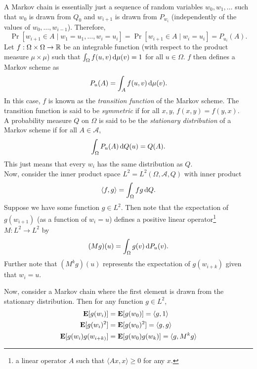 A Markov chain is essentially just a sequence of random variables $w_0,w_1,\ldots$ such that $w_0$ is drawn from $Q_0$ and $w_{i+1}$ is drawn from $P_{w_i}$ (independently of the values of $w_0,\ldots,w_{i-1}$). Therefore,
\[ \Pr[w_{i+1}\in A \mid w_1=u_1,\ldots,w_i=u_i] = \Pr[w_{i+1}\in A\mid w_i=u_i] = P_{u_i}(A). \]
Let $f:\Omega\times\Omega\to\mathbb{R}$ be an integrable function (with respect to the product measure $\mu\times\mu$) such that $\int_\Omega f(u,v)\operatorname{d}\!{\mu}(v)=1$ for all $u\in\Omega$. $f$ then defines a Markov scheme as
\[ P_u(A) = \int_A f(u,v)\operatorname{d}\!{\mu}(v). \]
In this case, $f$ is known as the \textit{transition function} of the Markov scheme. The transition function is said to be \textit{symmetric} if for all $x,y$, $f(x,y)=f(y,x)$.\\

A probability measure $Q$ on $\Omega$ is said to be the \textit{stationary distribution} of a Markov scheme if for all $A\in\mathcal{A}$,
\[ \int_{\Omega}P_u(A)\operatorname{d}\!{Q}(u) = Q(A). \]
This just means that every $w_i$ has the same distribution as $Q$.\\

Now, consider the inner product space $L^2 = L^2 (\Omega,\mathcal{A},Q)$ with inner product
\[ \langle f,g\rangle = \int_\Omega f g\operatorname{d}\!{Q}. \]
Suppose we have some function $g\in L^2$. Then note that the expectation of $g(w_{i+1})$ (as a function of $w_i = u$) defines a positive linear operator\footnote{a linear operator $A$ such that $\langle Ax,x\rangle\geq 0$ for any $x$.} $M:L^2\to L^2$ by
\[ (Mg)(u) = \int_\Omega g(v)\operatorname{d}\!{P_u}(v). \]
Further note that $(M^k g)(u)$ represents the expectation of $g(w_{i+k})$ given that $w_i=u$.

Now, consider a Markov chain where the first element is drawn from the stationary distribution. Then for any function $g\in L^2$,
\begin{align*}
	\textbf{E}[g(w_i)] &= \textbf{E}[g(w_0)] = \langle g,1\rangle \\
	\textbf{E}[g(w_i)^2] &= \textbf{E}[g(w_0)^2] = \langle g,g\rangle \\
	\textbf{E}[g(w_i)g(w_{i+k)}] &= \textbf{E}[g(w_0)g(w_k)] = \langle g,M^k g\rangle
\end{align*}

